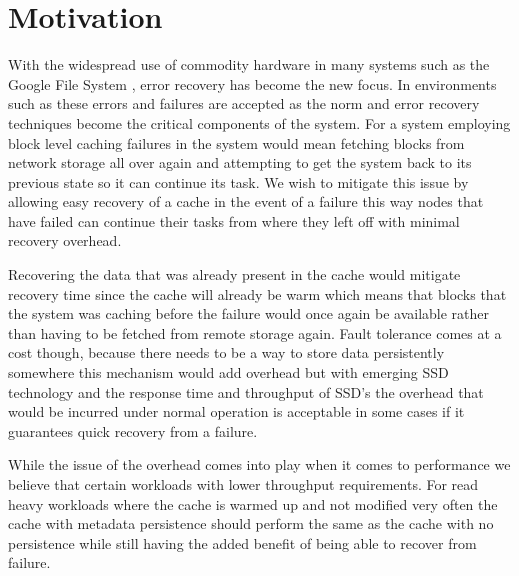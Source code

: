 \section{Motivation}
\label{sec:motivation}

With the widespread use of commodity hardware in many systems such as
the Google File System \cite{GFS}, error recovery has become the new
focus. In environments such as these errors and failures are accepted
as the norm and error recovery techniques become the critical
components of the system. For a system employing block level caching
failures in the system would mean fetching blocks from network storage
all over again and attempting to get the system back to its previous
state so it can continue its task. We wish to mitigate this issue by
allowing easy recovery of a cache in the event of a failure this way
nodes that have failed can continue their tasks from where they left
off with minimal recovery overhead.

Recovering the data that was already present in the cache would
mitigate recovery time since the cache will already be warm which
means that blocks that the system was caching before the failure would
once again be available rather than having to be fetched from remote
storage again. Fault tolerance comes at a cost though, because there
needs to be a way to store data persistently somewhere this mechanism
would add overhead but with emerging SSD technology and the response
time and throughput of SSD's the overhead that would be incurred under
normal operation is acceptable in some cases if it guarantees quick
recovery from a failure.

While the issue of the overhead comes into play when it comes to
performance we believe that certain workloads with lower throughput
requirements. For read heavy workloads where the cache is warmed up
and not modified very often the cache with metadata persistence should
perform the same as the cache with no persistence while still having
the added benefit of being able to recover from failure.
